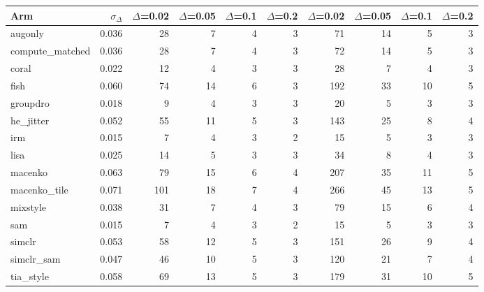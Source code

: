 \begin{tabular}{lrrrrrrrrr}
\toprule
Arm & $\sigma_\Delta$ & $\Delta$=0.02 & $\Delta$=0.05 & $\Delta$=0.1 & $\Delta$=0.2 & $\Delta$=0.02 & $\Delta$=0.05 & $\Delta$=0.1 & $\Delta$=0.2 \\
\midrule
augonly & 0.036 & 28 & 7 & 4 & 3 & 71 & 14 & 5 & 3 \\
compute\_matched & 0.036 & 28 & 7 & 4 & 3 & 72 & 14 & 5 & 3 \\
coral & 0.022 & 12 & 4 & 3 & 3 & 28 & 7 & 4 & 3 \\
fish & 0.060 & 74 & 14 & 6 & 3 & 192 & 33 & 10 & 5 \\
groupdro & 0.018 & 9 & 4 & 3 & 3 & 20 & 5 & 3 & 3 \\
he\_jitter & 0.052 & 55 & 11 & 5 & 3 & 143 & 25 & 8 & 4 \\
irm & 0.015 & 7 & 4 & 3 & 2 & 15 & 5 & 3 & 3 \\
lisa & 0.025 & 14 & 5 & 3 & 3 & 34 & 8 & 4 & 3 \\
macenko & 0.063 & 79 & 15 & 6 & 4 & 207 & 35 & 11 & 5 \\
macenko\_tile & 0.071 & 101 & 18 & 7 & 4 & 266 & 45 & 13 & 5 \\
mixstyle & 0.038 & 31 & 7 & 4 & 3 & 79 & 15 & 6 & 4 \\
sam & 0.015 & 7 & 4 & 3 & 2 & 15 & 5 & 3 & 3 \\
simclr & 0.053 & 58 & 12 & 5 & 3 & 151 & 26 & 9 & 4 \\
simclr\_sam & 0.047 & 46 & 10 & 5 & 3 & 120 & 21 & 7 & 4 \\
tia\_style & 0.058 & 69 & 13 & 5 & 3 & 179 & 31 & 10 & 5 \\
\bottomrule
\end{tabular}
